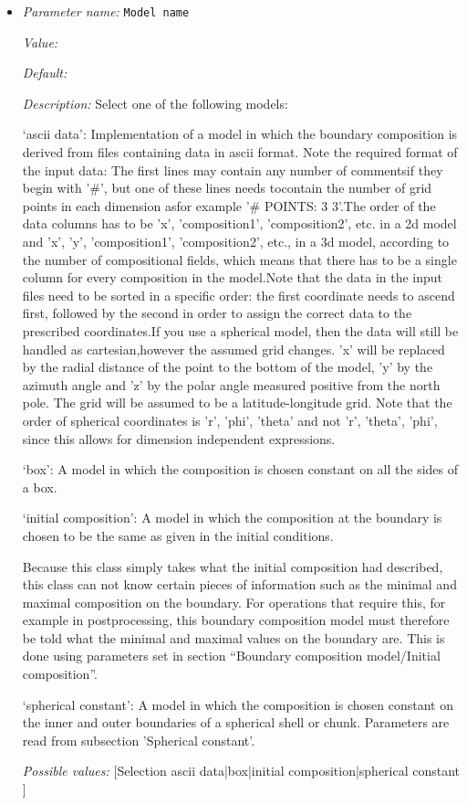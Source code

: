 \begin{itemize}
\item {\it Parameter name:} {\tt Model name}
\label{parameters:Boundary composition model/Model name}


{\it Value:} 


{\it Default:} 


{\it Description:} Select one of the following models:

`ascii data': Implementation of a model in which the boundary composition is derived from files containing data in ascii format. Note the required format of the input data: The first lines may contain any number of commentsif they begin with '#', but one of these lines needs tocontain the number of grid points in each dimension asfor example '# POINTS: 3 3'.The order of the data columns has to be 'x', 'composition1', 'composition2', etc. in a 2d model and 'x', 'y', 'composition1', 'composition2', etc., in a 3d model, according to the number of compositional fields, which means that there has to be a single column for every composition in the model.Note that the data in the input files need to be sorted in a specific order: the first coordinate needs to ascend first, followed by the second in order to assign the correct data to the prescribed coordinates.If you use a spherical model, then the data will still be handled as cartesian,however the assumed grid changes. 'x' will be replaced by the radial distance of the point to the bottom of the model, 'y' by the azimuth angle and 'z' by the polar angle measured positive from the north pole. The grid will be assumed to be a latitude-longitude grid. Note that the order of spherical coordinates is 'r', 'phi', 'theta' and not 'r', 'theta', 'phi', since this allows for dimension independent expressions. 

`box': A model in which the composition is chosen constant on all the sides of a box.

`initial composition': A model in which the composition at the boundary is chosen to be the same as given in the initial conditions.

Because this class simply takes what the initial composition had described, this class can not know certain pieces of information such as the minimal and maximal composition on the boundary. For operations that require this, for example in postprocessing, this boundary composition model must therefore be told what the minimal and maximal values on the boundary are. This is done using parameters set in section ``Boundary composition model/Initial composition''.

`spherical constant': A model in which the composition is chosen constant on the inner and outer boundaries of a spherical shell or chunk. Parameters are read from subsection 'Spherical constant'.


{\it Possible values:} [Selection ascii data|box|initial composition|spherical constant ]
\end{itemize}



